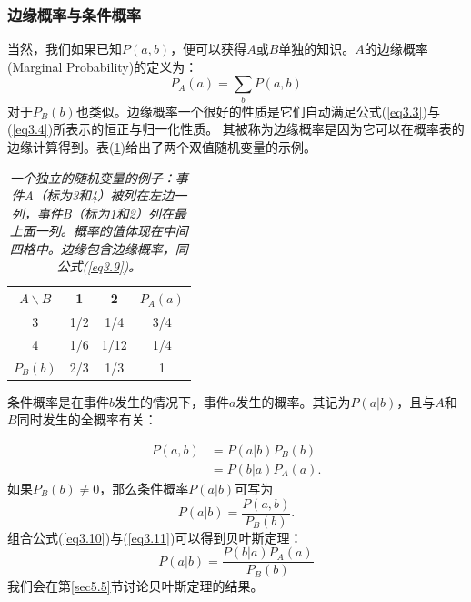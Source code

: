 \documentclass[UTF8]{ctexart}
\numberwithin{equation}{section}%
\numberwithin{figure}{section}%
\begin{document}
    \subsubsection{边缘概率与条件概率}\label{sec3.3.1}
    当然，我们如果已知$P(a,b)$，便可以获得$A$或$B$单独的知识。$A$的边缘概率(Marginal Probability)的定义为：
    \begin{equation}\label{eq3.9}
        P_A(a)=\sum_bP(a,b)
    \end{equation}
    对于$P_B(b)$也类似。边缘概率一个很好的性质是它们自动满足公式(\ref{eq3.3})与(\ref{eq3.4})所表示的恒正与归一化性质。
    其被称为边缘概率是因为它可以在概率表的边缘计算得到。表(\ref{table3.1})给出了两个双值随机变量的示例。
    \begin{table}[H]
        \centering
        \caption{\textit{一个独立的随机变量的例子：事件A（标为3和4）被列在左边一列，事件B（标为1和2）列在最上面一列。概率的值体现在中间四格中。边缘包含边缘概率，同公式(\ref{eq3.9})。}}
        \label{table3.1}
        {%
        \begin{tabular}{c|c|c|c}
        \hline
        \multicolumn{1}{c|}{$A\backslash B$} & \multicolumn{1}{c|}{1}   & \multicolumn{1}{c|}{2}   & \multicolumn{1}{c}{$P_A(a)$} \\ \hline
        \multicolumn{1}{c|}{3}   & \multicolumn{1}{c|}{1/2} & \multicolumn{1}{c|}{1/4} & \multicolumn{1}{c}{3/4}    \\ \hline
        4                        & 1/6                      & 1/12                     & 1/4                        \\ \hline
        $P_B(b)$                   & 2/3                      & 1/3                      & 1                          \\ \hline
        \end{tabular}
        }
        \end{table}
    条件概率是在事件$b$发生的情况下，事件$a$发生的概率。其记为$P(a|b)$，且与$A$和$B$同时发生的全概率有关：

    \begin{align}
    P(a,b)&=P(a|b)P_B(b)\label{eq3.10}\\
        &=P(b|a)P_A(a).\label{eq3.11}
    \end{align}
    如果$P_B(b)\neq 0$，那么条件概率$P(a|b)$可写为
    \begin{equation}
    P(a|b)=\frac{P(a,b)}{P_B(b)}.
    \end{equation}
    组合公式(\ref{eq3.10})与(\ref{eq3.11})可以得到贝叶斯定理：
    \begin{equation}\label{eq3.13}
    P(a|b)=\frac{P(b|a)P_A(a)}{P_B(b)}
    \end{equation}
    我们会在第\ref{sec5.5}节讨论贝叶斯定理的结果。
\end{document}
